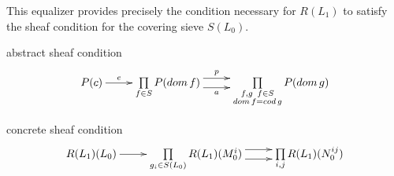 \begin{frame}
\begin{block}{}
This equalizer provides precisely the condition necessary for $R(L_1)$ to satisfy the sheaf condition for the covering sieve $S(L_0)$. 
\end{block}
\begin{block}{abstract sheaf condition}
\begin{displaymath}
\xymatrix{
P(c) \ar[r]^-{e}
&
\prod\limits_{f \in S}
P(dom \, f)
\ar@<1ex>[r]^-{p} \ar@<-1ex>[r]_-{a}
&
\prod\limits_{\substack{f,g \,\,\, f \in S \\ dom \, f=cod \, g}}
P(dom \, g)
}
\end{displaymath}
\end{block}
\begin{block}{concrete sheaf condition}
\begin{displaymath}
\xymatrix{
R(L_1)(L_0) \ar[r]
&
\prod\limits_{g_i \in S(L_0)} R(L_1)(M_0^i)
\ar@<1ex>[r]^-{} \ar@<-1ex>[r]_-{}
&
\prod\limits_{i,j} R(L_1)(N_0^{ij})
}
\end{displaymath}
\end{block}
\end{frame}

